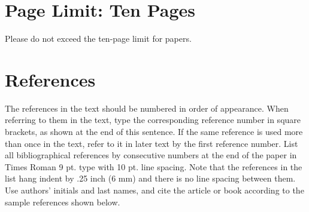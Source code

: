 \documentclass[letterpaper,10pt,twocolumn]{article} %
\begin{document}
\section{Page Limit: Ten Pages}

Please do not exceed the ten-page limit for papers.

\section{References}

The references in the text should be numbered in order of appearance. 
When referring to them in the text, type the corresponding reference number in square brackets, as shown at the end of this sentence\cite{Nobody06}. 
If the same reference is used more than once in the text, refer to it in later text by the first reference number. 
List all bibliographical references by consecutive numbers at the end of the paper in Times Roman 9 pt. type with 10 pt. line spacing. 
Note that the references in the list hang indent by .25 inch (6 mm) and there is no line spacing between them. 
Use authors’ initials and last names, and cite the article or book according to the sample references shown below.









 



%
{\small


}
    	
\end{document}
